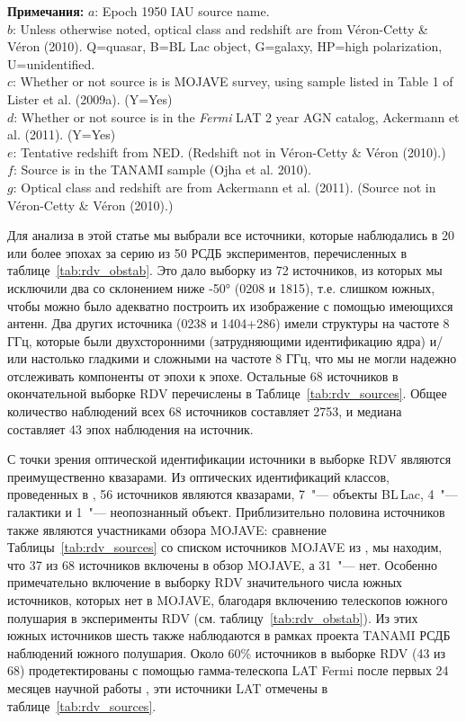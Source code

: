 \begin{table}[htb!]
\textbf{Примечания:}
$a$: Epoch 1950 IAU source name.\\
$b$: Unless otherwise noted, optical class and redshift are from V\'{e}ron-Cetty \& V\'{e}ron
(2010).
Q=quasar, B=BL Lac object, G=galaxy, HP=high polarization, U=unidentified.\\
$c$: Whether or not source is is MOJAVE survey, using sample
listed in Table 1 of Lister et al. (2009a). (Y=Yes)\\
$d$: Whether or not source is in the {\em Fermi} LAT 2 year AGN catalog, Ackermann et al. (2011).
(Y=Yes)\\
$e$: Tentative redshift from NED. (Redshift not in V\'{e}ron-Cetty \& V\'{e}ron (2010).)\\
$f$: Source is in the TANAMI sample (Ojha et al. 2010).\\
$g$: Optical class and redshift are from Ackermann et al. (2011). (Source not in V\'{e}ron-Cetty \&
V\'{e}ron (2010).)\\
\end{table}

Для анализа в этой статье мы выбрали все источники, которые наблюдались в 20 или более эпохах за
серию из 50 РСДБ экспериментов, перечисленных в таблице~\ref{tab:rdv_obstab}. Это дало выборку из 72
источников, из которых мы исключили два со склонением ниже \ang{-50} (0208 и
1815), т.\:е. слишком южных, чтобы можно было адекватно построить их изображение с
помощью имеющихся антенн. Два других источника (0238 и 1404+286) имели структуры на
частоте 8 ГГц, которые были двухсторонними (затрудняющими идентификацию ядра) и/или настолько
гладкими и сложными на частоте 8 ГГц, что мы не могли надежно отслеживать компоненты от эпохи к
эпохе. Остальные 68 источников в окончательной выборке RDV перечислены в
Таблице~\ref{tab:rdv_sources}. Общее количество наблюдений всех 68 источников составляет 2753, и
медиана составляет 43 эпох наблюдения на источник.

С точки зрения оптической идентификации источники в выборке RDV являются преимущественно квазарами.
Из оптических идентификаций классов, проведенных в \cite{Veron_2010}, 56 источников являются
квазарами, 7~"--- объекты BL\,Lac, 4~"--- галактики и 1~"--- неопознанный объект. Приблизительно
половина источников также являются участниками обзора MOJAVE: сравнение
Таблицы~\ref{tab:rdv_sources} со списком источников MOJAVE из \cite{Lister_2009a}, мы находим, что
37 из 68 источников включены в обзор MOJAVE, а 31~"--- нет. Особенно примечательно включение в
выборку RDV значительного числа южных источников, которых нет в MOJAVE, благодаря включению
телескопов южного полушария в эксперименты RDV (см. таблицу~\ref{tab:rdv_obstab}). Из этих южных
источников шесть также наблюдаются в рамках проекта TANAMI \cite{Ojha_2010} РСДБ наблюдений южного
полушария. Около 60\% источников в выборке RDV (43 из 68) продетектированы с помощью гамма-телескопа
LAT Fermi после первых 24 месяцев научной работы \cite{Ackermann_2011}, эти источники LAT отмечены в
таблице~\ref{tab:rdv_sources}.

